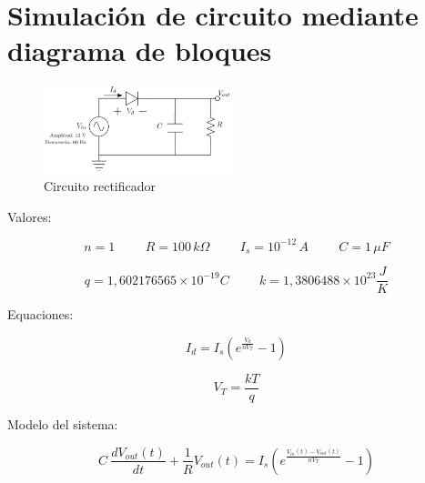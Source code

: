 \section{Simulación de circuito mediante diagrama de bloques}


\begin{figure}[H]\label{fig:rectificador}
    \centering
    \includegraphics[width=0.5\textwidth]{imagenes/circuito.png}
    \caption{Circuito rectificador}
\end{figure}

Valores:

\begin{equation*}
    n = 1 \hspace{1cm} R = 100\, k \Omega \hspace{1cm} I_s = 10 ^ {-12} \, A
    \hspace{1cm} C = 1\, \mu F
\end{equation*}

\begin{equation*}
   q = 1, 602176565 \times 10 ^ {-19} C
   \hspace{1cm}
   k = 1, 3806488 \times 10^ {23} \dfrac{J}{K}
\end{equation*}

Equaciones: \\

\begin{multicols}{2}

\begin{equation*}
    I_d = I_s \left(e ^{
        \frac{V_d}{nV_T}
        } - 1 \right)
\end{equation*}

\begin{equation*}
V_T = \frac{kT}{q}    
\end{equation*}

\end{multicols}

Modelo del sistema:

\begin{equation*}
    C\:\frac{dV_{out}\left(t\right)}{dt}+\frac{1}{R}V_{out}\left(t\right)
    =
    I_s \left(e ^{
    \frac{V_{in}\left(t\right)-V_{out}\left(t\right)}
    {nV_T}
    } - 1 \right)
\end{equation*}

